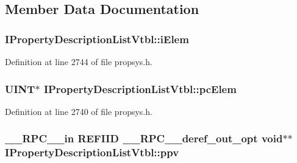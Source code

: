 \subsection{Member Data Documentation}
\subsubsection[{\texorpdfstring{i\+Elem}{iElem}}]{ I\+Property\+Description\+List\+Vtbl\+::i\+Elem}\hypertarget{struct_i_property_description_list_vtbl_a3ef897a5f74cc55b05270e873743f6a1}{}\label{struct_i_property_description_list_vtbl_a3ef897a5f74cc55b05270e873743f6a1}


Definition at line 2744 of file propsys.\+h.

\subsubsection[{\texorpdfstring{pc\+Elem}{pcElem}}]{ {\bf U\+I\+NT}$\ast$ I\+Property\+Description\+List\+Vtbl\+::pc\+Elem}\hypertarget{struct_i_property_description_list_vtbl_aabf6c24ceb6972597d38b95c69dcc6ea}{}\label{struct_i_property_description_list_vtbl_aabf6c24ceb6972597d38b95c69dcc6ea}


Definition at line 2740 of file propsys.\+h.

\subsubsection[{\texorpdfstring{ppv}{ppv}}]{ {\bf \+\_\+\+\_\+\+R\+P\+C\+\_\+\+\_\+in} {\bf R\+E\+F\+I\+ID} {\bf \+\_\+\+\_\+\+R\+P\+C\+\_\+\+\_\+deref\+\_\+out\+\_\+opt} {\bf void}$\ast$$\ast$ I\+Property\+Description\+List\+Vtbl\+::ppv}\hypertarget{struct_i_property_description_list_vtbl_afab486965fdd1ab55bff9c70dcb9c860}{}\label{struct_i_property_description_list_vtbl_afab486965fdd1ab55bff9c70dcb9c860}


